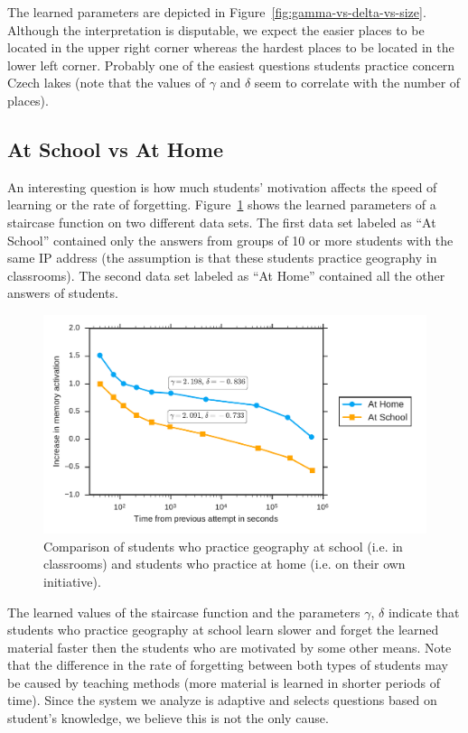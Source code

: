 The learned parameters are depicted in Figure~\ref{fig:gamma-vs-delta-vs-size}. Although the interpretation is disputable, we expect the easier places to be located in the upper right corner whereas the hardest places to be located in the lower left corner. Probably one of the easiest questions students practice concern Czech lakes (note that the values of $\gamma$ and $\delta$ seem to correlate with the number of places).

\subsection{At School vs At Home}

An interesting question is how much students' motivation affects the speed of learning or the rate of forgetting. Figure~\ref{fig:at-home-vs-at-school} shows the learned parameters of a staircase function on two different data sets. The first data set labeled as ``At School'' contained only the answers from groups of 10 or more students with the same IP address (the assumption is that these students practice geography in classrooms). The second data set labeled as ``At Home'' contained all the other answers of students.

\begin{figure}[htbp]
  \centering
  \includegraphics[width=\textwidth]{img/at-home-vs-at-school}
  \caption{Comparison of students who practice geography at school (i.e. in classrooms) and students who practice at home (i.e. on their own initiative).}
  \label{fig:at-home-vs-at-school}
\end{figure}

The learned values of the staircase function and the parameters $\gamma$, $\delta$ indicate that students who practice geography at school learn slower and forget the learned material faster then the students who are motivated by some other means. Note that the difference in the rate of forgetting between both types of students may be caused by teaching methods (more material is learned in shorter periods of time). Since the system we analyze is adaptive and selects questions based on student's knowledge, we believe this is not the only cause.
